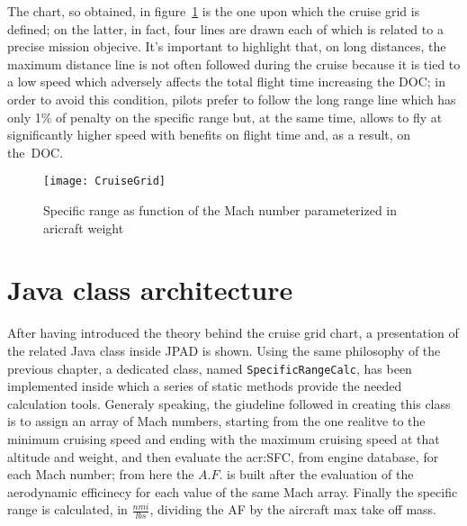 \bigskip
\noindent
The chart, so obtained, in figure~\ref{fig:Figure6} is the one upon which the cruise grid is defined; on the latter, in fact, four lines are drawn each of which is related to a precise mission objecive.
%
It's important to highlight that, on long distances, the maximum distance line is not often followed during the cruise because it is tied to a low speed which adversely affects the total flight time increasing the \gls{DOC}; in order to avoid this condition, pilots prefer to follow the long range line which has only 1\% of penalty on the specific range but, at the same time, allows to fly at significantly higher speed with benefits on flight time and, as a result, on the~\gls{DOC}.
%
\begin{figure}[H]
\centering
\texttt{[image: CruiseGrid]}
\caption{Specific range as function of the Mach number parameterized in aricraft weight}
\label{fig:Figure6}
\end{figure}
%
\section{Java class architecture}
After having introduced the theory behind the cruise grid chart, a presentation of the related Java class inside \gls{JPAD} is shown. Using the same philosophy of the previous chapter, a dedicated class, named \lstinline[language=Java]!SpecificRangeCalc!, has been implemented inside which a series of static methods provide the needed calculation tools. Generaly speaking, the giudeline followed in creating this class is to assign an array of Mach numbers, starting from the one realitve to the minimum cruising speed and ending with the maximum cruising speed at that altitude and weight, and then evaluate the \gls{acr:SFC}, from engine database, for each Mach number; from here the $A.F.$ is built after the evaluation of the aerodynamic efficinecy for each value of the same Mach array. Finally the specific range is calculated, in $\frac{\si{nmi}}{\si{lbs}}$, dividing the \gls{AF} by the aircraft max take off mass.

